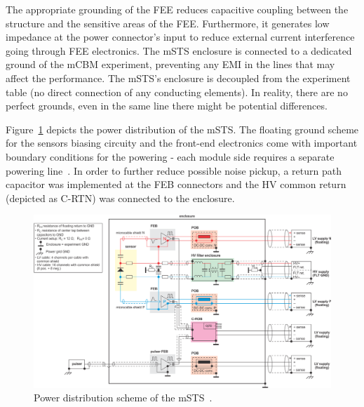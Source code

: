 The appropriate grounding of the FEE reduces capacitive coupling between the structure and the sensitive areas of the \gls{FEE}. Furthermore, it generates low impedance at the power connector's input to reduce external current interference going through FEE electronics. The \gls{mSTS} enclosure is connected to a dedicated ground of the \gls{mCBM} experiment, preventing any \gls{EMI} in the lines that may affect the performance. The \gls{mSTS}'s enclosure is decoupled from the experiment table (no direct connection of any conducting elements). In reality, there are no perfect grounds, even in the same line there might be potential differences. 

Figure~\ref{fig_msts_power} depicts the power distribution of the \gls{mSTS}. The floating ground scheme for the sensors biasing circuity and the front-end electronics come with important boundary conditions for the powering - each module side requires a separate powering line~\cite{RodriguezRodriguez2020}. In order to further reduce possible noise pickup, a return path capacitor was implemented at the \gls{FEB} connectors and the \gls{HV} common return (depicted as C-RTN) was connected to the enclosure.

\begin{figure}[!h]
\centering
\includegraphics[width=0.95\columnwidth]{Chapter6/DCS/images/power_distribution.png}
\caption{Power distribution scheme of the \gls{mSTS}~\cite{Lymanets}.}
\label{fig_msts_power}
\end{figure}
\newpage

